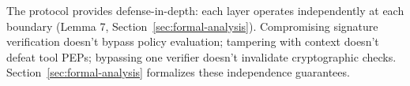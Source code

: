 The protocol provides defense-in-depth: each layer operates independently at each boundary (Lemma 7, Section~\ref{sec:formal-analysis}). Compromising signature verification doesn't bypass policy evaluation; tampering with context doesn't defeat tool PEPs; bypassing one verifier doesn't invalidate cryptographic checks. Section~\ref{sec:formal-analysis} formalizes these independence guarantees.
